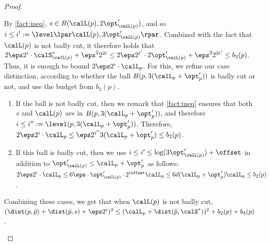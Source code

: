 \begin{proof}
\begin{enumerate}
 By \cref{fact:ineq}, $s \in B(\calL(p), 2\opt'_{\calL(p)})$, and so
  $i \leq i' := \level\lpar \calL(p),  3\opt'_{\calL(p)}\rpar$. 
 Combined with the fact that $\calL(p)$ is not badly cut,  it therefore holds that 
 $2 \eps 2^i\cdot \calS^*_{\calL(p)} + \eps^2 2^{2i} \leq 2 \eps 2^{i'} \cdot 2\opt'_{\calL(p)} + \eps^2 2^{2i'} \leq b_3(p)$. 
 Thus, it is enough to bound $2  \eps 2^i \cdot \calL_p$. For this, we refine our case distinction, according to whether the ball $B(p, 3(\calL_p + \opt'_p))$ is badly cut or not, and use the budget from $b_2(p)$. 
 \begin{enumerate}
  \item If the ball is not badly cut, then we remark that \cref{fact:ineq} ensures  that both $s$ and $\calL(p)$ are in $B(p, 3(\calL_p + \opt'_p))$, and therefore $i \leq i'' := \level(p, 3(\calL_p + \opt'_p))$. Therefore, 
 $2  \eps 2^i \cdot\calL_p \leq \eps 2^{i''} 3(\calL_p + \opt'_p) \leq b_2(p)$.
  \item If this ball is badly cut, then we use $i \leq i' \leq \log(3\opt'_{\calL(p)}) + \offset$  in addition to $\opt'_{\calL(p)} \leq \calL_p + \opt'_p$ as follows:  
 $2  \eps 2^i \cdot\calL_p \leq 6 \eps \cdot \opt'_{\calL(p)} \cdot 2^{\offset} \calL_p \leq 6d (\calL_p + \opt'_p) \calL_p \leq b_2(p)$. %
 \end{enumerate}
 Combining these cases, we get that when $\calL(p)$ is not badly cut, $(\dist(p, \tilde p) + \dist(\tilde p, s) + \eps 2^i)^2 \leq (\calL_p + \dist(\tilde p, \calS^*))^2 + b_2(p) + b_3(p)$.
  \end{enumerate}



\end{proof}
